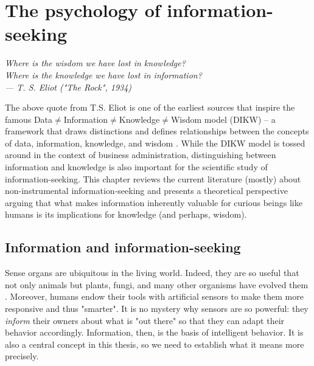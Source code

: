 \chapter{The psychology of information-seeking}\label{ch:psychology}

\begin{flushright}{\slshape
    Where is the wisdom we have lost in knowledge? \\
    Where is the knowledge we have lost in information? \\
    --- T. S. Eliot ("The Rock", 1934)}
\end{flushright}
The above quote from T.S. Eliot is one of the earliest sources that inspire the famous Data$\neq$Information$\neq$Knowledge$\neq$Wisdom model (DIKW) -- a framework that draws distinctions and defines relationships between the concepts of data, information, knowledge, and wisdom \cite{sharma_5_2008}. While the DIKW model is tossed around in the context of business administration, distinguishing between information and knowledge is also important for the scientific study of information-seeking. This chapter reviews the current literature (mostly) about non-instrumental information-seeking and presents a theoretical perspective arguing that what makes information inherently valuable for curious beings like humans is its implications for knowledge (and perhaps, wisdom).

\section{Information and information-seeking}

Sense organs are ubiquitous in the living world. Indeed, they are so useful that not only animals but plants, fungi, and many other organisms have evolved them \cite{trewavas_plant_2005,braunsdorf_fungal_2016,bourret_census_2006,schwab_evolution_2018}. Moreover, humans endow their tools with artificial sensors to make them more responsive and thus "smarter". %
It is no mystery why sensors are so powerful: they \emph{inform} their owners about what is "out there" so that they can adapt their behavior accordingly. Information, then, is the basis of intelligent behavior. It is also a central concept in this thesis, so we need to establish what it means more precisely. 

